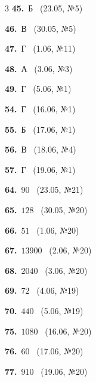 \documentclass[12pt]{article}
\begin{document}
\ifshowsolutions
{}
\begin{multicols}{3}\noindent
\noindent\textbf{45.}~Б \ {\scriptsize\color{gray}(23.05, №5)}\par
\noindent\textbf{46.}~В \ {\scriptsize\color{gray}(30.05, №5)}\par
\noindent\textbf{47.}~Г \ {\scriptsize\color{gray}(1.06, №11)}\par
\noindent\textbf{48.}~А \ {\scriptsize\color{gray}(3.06, №3)}\par
\noindent\textbf{49.}~Г \ {\scriptsize\color{gray}(5.06, №1)}\par
\noindent\textbf{54.}~Г \ {\scriptsize\color{gray}(16.06, №1)}\par
\noindent\textbf{55.}~Б \ {\scriptsize\color{gray}(17.06, №1)}\par
\noindent\textbf{56.}~В \ {\scriptsize\color{gray}(18.06, №4)}\par
\noindent\textbf{57.}~Г \ {\scriptsize\color{gray}(19.06, №1)}\par
\noindent\textbf{64.}~$90$ \ {\scriptsize\color{gray}(23.05, №21)}\par
\noindent\textbf{65.}~$128$ \ {\scriptsize\color{gray}(30.05, №20)}\par
\noindent\textbf{66.}~$51$ \ {\scriptsize\color{gray}(1.06, №20)}\par
\noindent\textbf{67.}~$13900$ \ {\scriptsize\color{gray}(2.06, №20)}\par
\noindent\textbf{68.}~$2040$ \ {\scriptsize\color{gray}(3.06, №20)}\par
\noindent\textbf{69.}~$72$ \ {\scriptsize\color{gray}(4.06, №19)}\par
\noindent\textbf{70.}~$440$ \ {\scriptsize\color{gray}(5.06, №19)}\par
\noindent\textbf{75.}~$1080$ \ {\scriptsize\color{gray}(16.06, №20)}\par
\noindent\textbf{76.}~$60$ \ {\scriptsize\color{gray}(17.06, №20)}\par
\noindent\textbf{77.}~$910$ \ {\scriptsize\color{gray}(19.06, №20)}\par
\end{multicols}
\fi

\endgroup
\end{document}
